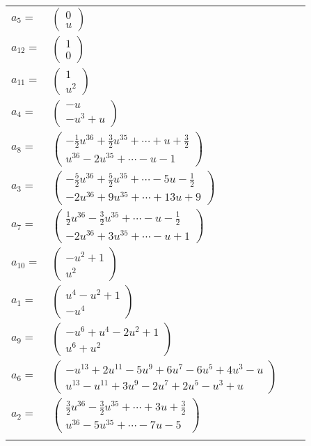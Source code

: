 \documentclass[1p]{elsarticle_modified}
\theoremstyle{definition}
\begin{document}
\begin{tabular}{m{7pt} m{180pt} m{7pt} m{180pt} }
\flushright $a_{5}=$&$\begin{pmatrix}0\\u\end{pmatrix}$ \\
\flushright $a_{12}=$&$\begin{pmatrix}1\\0\end{pmatrix}$ \\
\flushright $a_{11}=$&$\begin{pmatrix}1\\u^2\end{pmatrix}$ \\
\flushright $a_{4}=$&$\begin{pmatrix}- u\\- u^3+u\end{pmatrix}$ \\
\flushright $a_{8}=$&$\begin{pmatrix}-\frac{1}{2} u^{36}+\frac{3}{2} u^{35}+\cdots+u+\frac{3}{2}\\u^{36}-2 u^{35}+\cdots- u-1\end{pmatrix}$ \\
\flushright $a_{3}=$&$\begin{pmatrix}-\frac{5}{2} u^{36}+\frac{5}{2} u^{35}+\cdots-5 u-\frac{1}{2}\\-2 u^{36}+9 u^{35}+\cdots+13 u+9\end{pmatrix}$ \\
\flushright $a_{7}=$&$\begin{pmatrix}\frac{1}{2} u^{36}-\frac{3}{2} u^{35}+\cdots- u-\frac{1}{2}\\-2 u^{36}+3 u^{35}+\cdots- u+1\end{pmatrix}$ \\
\flushright $a_{10}=$&$\begin{pmatrix}- u^2+1\\u^2\end{pmatrix}$ \\
\flushright $a_{1}=$&$\begin{pmatrix}u^4- u^2+1\\- u^4\end{pmatrix}$ \\
\flushright $a_{9}=$&$\begin{pmatrix}- u^6+u^4-2 u^2+1\\u^6+u^2\end{pmatrix}$ \\
\flushright $a_{6}=$&$\begin{pmatrix}- u^{13}+2 u^{11}-5 u^9+6 u^7-6 u^5+4 u^3- u\\u^{13}- u^{11}+3 u^9-2 u^7+2 u^5- u^3+u\end{pmatrix}$ \\
\flushright $a_{2}=$&$\begin{pmatrix}\frac{3}{2} u^{36}-\frac{3}{2} u^{35}+\cdots+3 u+\frac{3}{2}\\u^{36}-5 u^{35}+\cdots-7 u-5\end{pmatrix}$\\&\end{tabular}
\end{document}
